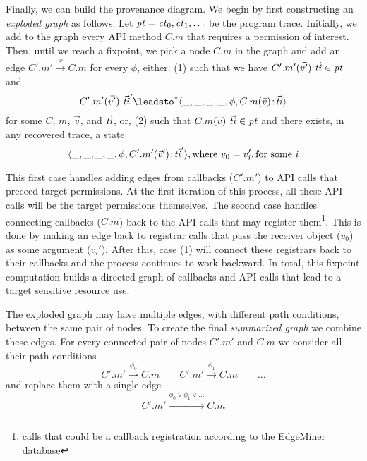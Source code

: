 Finally, we can build the provenance diagram.  
 We begin by first constructing an \emph{exploded graph} as follows. Let
$\mathit{pt} = \mathit{ct}_0, \mathit{ct}_1, \ldots$ be the program trace.
Initially, we add to the graph every API method $C.m$ that requires a
permission of interest. Then, until we reach a fixpoint, we pick a
node $C.m$ in the graph and add an edge $C'.m' \overset{\phi}{\longrightarrow} C.m$
for every $\phi$, either: (1) such that we have
$C'.m'(\vec{v'})\ \vec{\mathit{ti}} \in \mathit{pt}$ and
\[
C'.m'(\vec{v'})\ \vec{\var{ti}}' \leadsto^* \langle \_, \_, \_, \_, \phi, C.m(\vec{v})\cpair\vec{\var{ti}}
\rangle
\]
%
for some $C$, $m$, $\vec{v}$, and $\vec{\mathit{ti}}$, or, (2) such that $C.m(\vec{v})\ \vec{\mathit{ti}} \in \mathit{pt}$
and there exists, in any recovered trace, a state
%
\[
  \langle\_, \_, \_, \_, \phi, C'.m'(\vec{v}')\!:\!\vec{\mathit{ti}}' \rangle,
  \text{where }
  v_0 = v_i',
  \text{for some }
  i
\]

This first case handles adding edges from callbacks ($C'.m'$) to API calls that
preceed target permissions. At the first iteration of this process, all these API
calls will be the target permissions themselves. The second case handles connecting
callbacks ($C.m$) back to the API calls that may register
them\footnote{calls that could be a callback registration according to the EdgeMiner database}.
This is done by making an edge back to registrar calls that pass the receiver object ($v_0$)
as some argument ($v_i'$). After this, case (1) will connect these registrars back to their
callbacks and the process continues to work backward.
%
%
In total, this fixpoint computation builds a directed graph of callbacks and API calls
that lead to a target sensitive resource use.


The exploded graph may have multiple edges, with different path
conditions, between the same pair of nodes.  To create the final
\emph{summarized graph} we combine these edges. For every connected
pair of nodes $C'.m'$ and $C.m$ we consider all their path conditions
\[
C'.m' \overset{\phi_0}{\longrightarrow} C.m \qquad
C'.m' \overset{\phi_1}{\longrightarrow} C.m \qquad
\ldots
\]
and replace them with a single edge
\[
C'.m' \overset{\phi_0 \vee \phi_1 \vee \ldots}{\xrightarrow{\hspace{1cm}}} C.m
\]

